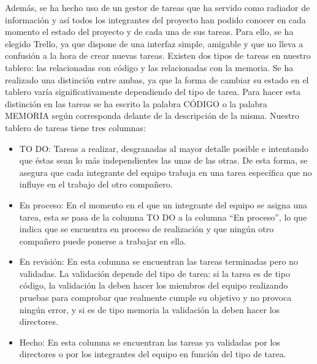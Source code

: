 Además, se ha hecho uso de un gestor de tareas que ha servido como radiador de información y así todos los integrantes del proyecto han podido conocer en cada momento el estado del proyecto y de cada una de sus tareas. Para ello, se ha elegido Trello, ya que dispone de una interfaz simple, amigable y que no lleva a confusión a la hora de crear nuevas tareas.
Existen dos tipos de tareas en nuestro tablero: las relacionadas con código y las relacionadas con la memoria. Se ha realizado una distinción entre ambas, ya que la forma de cambiar su estado en el tablero varía significativamente dependiendo del tipo de tarea. Para hacer esta distinción en las tareas se ha escrito la palabra CÓDIGO o la palabra MEMORIA según corresponda delante de la descripción de la misma. Nuestro tablero de tareas tiene tres columnas:
\begin{itemize}
	\item TO DO: Tareas a realizar, desgranadas al mayor detalle posible e intentando que éstas sean lo más independientes las unas de las otras. De esta forma, se asegura que cada integrante del equipo trabaja en una tarea específica que no influye en el trabajo del otro compañero.
	
	\item En proceso: En el momento en el que un integrante del equipo se asigna una tarea, esta se pasa de la columna TO DO a la columna ``En proceso'', lo que indica que se encuentra en proceso de realización y que ningún otro compañero puede ponerse a trabajar en ella. 
	
	\item En revisión: En esta columna se encuentran las tareas terminadas pero no validadas. La validación depende del tipo de tarea: si la tarea es de tipo código, la validación la deben hacer los miembros del equipo realizando pruebas para comprobar que realmente cumple su objetivo y no provoca ningún error, y si es de tipo memoria la validación la deben hacer los directores.
	
	\item Hecho: En esta columna se encuentran las tareas ya validadas por los directores o por los integrantes del equipo en función del tipo de tarea.  
	
\end{itemize}


